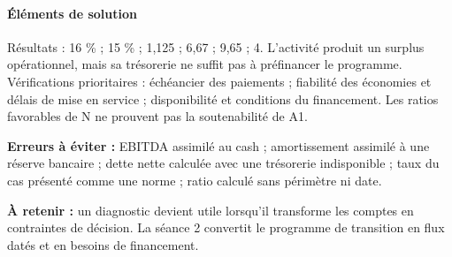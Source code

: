 \documentclass[12pt,a4paper]{article}
\begin{document}
\paragraph{Éléments de solution}
Résultats : 16 \% ; 15 \% ; 1,125 ; 6,67 ; 9,65 ; 4. L’activité produit un surplus opérationnel, mais sa trésorerie ne suffit pas à préfinancer le programme. Vérifications prioritaires : échéancier des paiements ; fiabilité des économies et délais de mise en service ; disponibilité et conditions du financement. Les ratios favorables de N ne prouvent pas la soutenabilité de A1.


\textbf{Erreurs à éviter :} EBITDA assimilé au cash ; amortissement assimilé à une réserve bancaire ; dette nette calculée avec une trésorerie indisponible ; taux du cas présenté comme une norme ; ratio calculé sans périmètre ni date.


\textbf{À retenir :} un diagnostic devient utile lorsqu’il transforme les comptes en contraintes de décision. La séance 2 convertit le programme de transition en flux datés et en besoins de financement.
\end{document}
